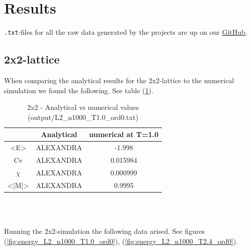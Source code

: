 \documentclass{article}
\begin{document}
\vspace{1cm}

\section{Results} \label{sec:Results}

  \texttt{.txt}-files for all the raw data generated by the projects are up on our \href{https://github.com/Erikbgram/Fys3150}{GitHub}. \\

\subsection{2x2-lattice}

When comparing the analytical results for the 2x2-lattice to the numerical simulation we found the following. See table (\ref{tab:analyticalvsnumerical}).

  \begin{table}[ht]
    \centering
    \caption{2x2 - Analytical vs numerical values (output/L2\_n1000\_T1.0\_ord0.txt)}
    \vspace{2mm}
    \label{tab:analyticalvsnumerical}
    \begin{tabular}{|c|c|c|}
        \hline
         & Analytical & numerical at T=1.0\\
        \hline \hline
        <E> & ALEXANDRA & -1.998 \\
        Cv & ALEXANDRA & 0.015984 \\
        $\chi$ & ALEXANDRA & 0.000999 \\
        <|M|> & ALEXANDRA & 0.9995 \\
        \hline
    \end{tabular} \\
    \hspace{0pt}\\
  \end{table}

Running the 2x2-simulation the following data arised. See figures (\ref{fig:energy_L2_n1000_T1.0_ord0}), (\ref{fig:energy_L2_n1000_T2.4_ord0}).
\end{document}
